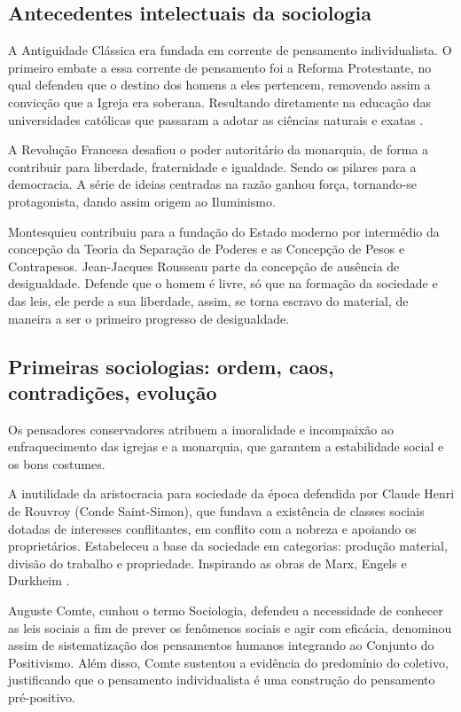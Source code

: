 \subsection{Antecedentes intelectuais da sociologia}

A Antiguidade Clássica era fundada em corrente de pensamento individualista.
O primeiro embate a essa corrente de pensamento foi a Reforma Protestante, no qual defendeu que o destino dos homens a eles pertencem, removendo assim a convicção que a Igreja era soberana.
Resultando diretamente na educação das universidades católicas que passaram a adotar as ciências naturais e exatas \cite{quintaneiro2003toque}.

A Revolução Francesa desafiou o poder autoritário da monarquia, de forma a contribuir para liberdade, fraternidade e igualdade.
Sendo os pilares para a democracia. 
A série de ideias centradas na razão ganhou força, tornando-se protagonista, dando assim origem ao Iluminismo. 

Montesquieu contribuiu para a fundação do Estado moderno por intermédio da concepção da Teoria da Separação de Poderes e as Concepção de Pesos e Contrapesos.
Jean-Jacques Rousseau parte da concepção de ausência de desigualdade.
Defende que o homem é livre, só que na formação da sociedade e das leis, ele perde a sua liberdade, assim, se torna escravo do material, de maneira a ser o primeiro progresso de desigualdade.

\subsection{Primeiras sociologias: ordem, caos, contradições, evolução}

Os pensadores conservadores atribuem a imoralidade e incompaixão ao enfraquecimento das igrejas e a monarquia, que garantem a estabilidade social e os bons costumes.

A inutilidade da aristocracia para sociedade da época defendida por Claude Henri de Rouvroy (Conde Saint-Simon), que fundava a existência de classes sociais dotadas de interesses conflitantes, em conflito com a nobreza e apoiando os proprietários.
Estabeleceu a base da sociedade em categorias: produção material, divisão do trabalho e propriedade.
Inspirando as obras de Marx, Engels e Durkheim \cite{quintaneiro2003toque}.

Auguste Comte, cunhou o termo Sociologia, defendeu a necessidade de conhecer as leis sociais a fim de prever os fenômenos sociais e agir com eficácia, denominou assim de sistematização dos pensamentos humanos integrando ao Conjunto do Positivismo.
Além disso, Comte sustentou a evidência do predomínio do coletivo, justificando que o pensamento individualista é uma construção do pensamento pré-positivo.

